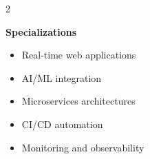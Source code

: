 \documentclass[10pt,a4paper]{article}
\begin{document}
\begin{multicols}{2}
{\vspace{3pt}
\textbf{Specializations}
\begin{itemize}[leftmargin=10pt,itemsep=2pt,topsep=2pt,parsep=0pt]
  \item Real-time web applications
  \item AI/ML integration
  \item Microservices architectures
  \item CI/CD automation
  \item Monitoring and observability
\end{itemize}
}

\end{multicols}
\end{document}

